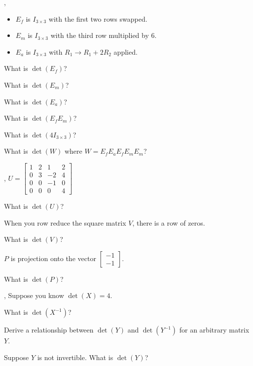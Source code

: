 \documentclass{article}
\newcommand{\mat}[1]{\begin{bmatrix}#1\end{bmatrix}}
\begin{document}
	\vspace{-.2in}
	\sep
	\vspace{-.3in}
	\begin{itemize}
		\item $E_f$ is $I_{3\times 3}$ with the first two rows swapped.
		\item $E_m$ is $I_{3\times 3}$ with the third row multiplied by 6.
		\item $E_a$ is $I_{3\times 3}$ with $R_1\to R_1+2R_2$ applied.
	\end{itemize}

	\begin{Enum}
		\item What is $\det(E_f)$?
		\item What is $\det(E_m)$?
		\item What is $\det(E_a)$?
		\item What is $\det(E_fE_m)$?
		\item What is $\det(4I_{3\times 3})$?
		\item What is $\det(W)$ where $W=E_fE_aE_fE_mE_m$?
	\end{Enum}

	\sep
	$U=\mat{1&2&1&2\\0&3&-2&4\\0&0&-1&0\\0&0&0&4}$
	\begin{Enum}
		\item What is $\det(U)$?
	\end{Enum}
	When you row reduce the square matrix $V$, there is a row of zeros.
	\begin{Enum}[resume]
		\item What is $\det(V)$?
	\end{Enum}

	$P$ is projection onto the vector $\mat{-1\\-1}$.
	\begin{Enum}[resume]
		\item What is $\det(P)$?
	\end{Enum}

	\sep
	Suppose you know $\det(X)=4$.
	\begin{Enum}
		\item What is $\det(X^{-1})$?
		\item Derive a relationship between $\det(Y)$
			and $\det(Y^{-1})$ for an arbitrary matrix $Y$.
		\item Suppose $Y$ is not invertible.  What is $\det(Y)$?
	\end{Enum}
\end{document}
